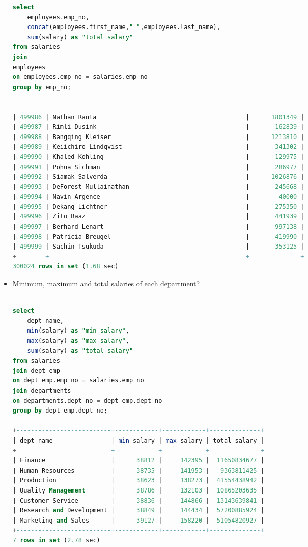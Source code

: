 \documentclass[12pt]{article}
\begin{document}
\begin{itemize}
\begin{lstlisting}[language=SQL]
select  
	employees.emp_no, 
	concat(employees.first_name," ",employees.last_name),
	sum(salary) as "total salary" 
from salaries
join
employees
on employees.emp_no = salaries.emp_no
group by emp_no;


| 499986 | Nathan Ranta                                         |      1801349 |
| 499987 | Rimli Dusink                                         |       162839 |
| 499988 | Bangqing Kleiser                                     |      1213810 |
| 499989 | Keiichiro Lindqvist                                  |       341302 |
| 499990 | Khaled Kohling                                       |       129975 |
| 499991 | Pohua Sichman                                        |       286977 |
| 499992 | Siamak Salverda                                      |      1026876 |
| 499993 | DeForest Mullainathan                                |       245668 |
| 499994 | Navin Argence                                        |        40000 |
| 499995 | Dekang Lichtner                                      |       275350 |
| 499996 | Zito Baaz                                            |       441939 |
| 499997 | Berhard Lenart                                       |       997138 |
| 499998 | Patricia Breugel                                     |       419990 |
| 499999 | Sachin Tsukuda                                       |       353125 |
+--------+------------------------------------------------------+--------------+
300024 rows in set (1.68 sec)


\end{lstlisting}


\item Minimum, maximum and total salaries of each department?
\begin{lstlisting}[language=SQL]

select  
	dept_name, 
	min(salary) as "min salary", 
	max(salary) as "max salary", 
	sum(salary) as "total salary"
from salaries
join dept_emp
on dept_emp.emp_no = salaries.emp_no
join departments
on departments.dept_no = dept_emp.dept_no
group by dept_emp.dept_no;

+--------------------------+------------+------------+--------------+
| dept_name                | min salary | max salary | total salary |
+--------------------------+------------+------------+--------------+
| Finance                  |      38812 |     142395 |  11650834677 |
| Human Resources          |      38735 |     141953 |   9363811425 |
| Production               |      38623 |     138273 |  41554438942 |
| Quality Management       |      38786 |     132103 |  10865203635 |
| Customer Service         |      38836 |     144866 |  13143639841 |
| Research and Development |      38849 |     144434 |  57200885924 |
| Marketing and Sales      |      39127 |     158220 |  51054820927 |
+--------------------------+------------+------------+--------------+
7 rows in set (2.78 sec)


\end{lstlisting}
\end{itemize}
\end{document}
